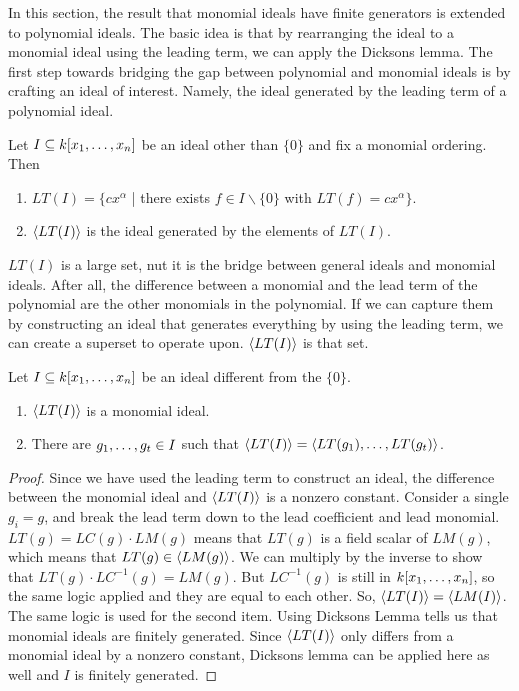 In this section, the result that monomial ideals have finite generators is extended to polynomial ideals. The basic idea is that by rearranging the ideal to a monomial ideal using the leading term, we can apply the Dicksons lemma. The first step towards bridging the gap between polynomial and monomial ideals is by crafting an ideal of interest. Namely, the ideal generated by the leading term of a polynomial ideal. 

\begin{definition}
    Let $I \subseteq k\lbrack x_1, \dots, x_n \rbrack$ be an ideal other than $\lbrace 0\rbrace$ and fix a monomial ordering. Then 
    \begin{enumerate}
        \item $LT(I) = \{cx^\alpha$ | there exists $f \in I \backslash \{0\}$ with $LT(f) = cx^\alpha\}$.
        \item $\langle LT(I) \rangle$ is the ideal generated by the elements of $LT(I)$.
    \end{enumerate}
\end{definition}

$LT(I)$ is a large set, nut it is the bridge between general ideals and monomial ideals. After all, the difference between a monomial and the lead term of the polynomial are the other monomials in the polynomial. If we can capture them by constructing an ideal that generates everything by using the leading term, we can create a superset to operate upon. $\langle LT(I) \rangle$ is that set.  

\begin{proposition}
Let $I \subseteq k\lbrack x_1, \dots, x_n \rbrack$ be an ideal different from the  $\lbrace 0\rbrace$.
\begin{enumerate}
    \item $\langle LT(I) \rangle$ is a monomial ideal.
    \item There are $g_1, \dots, g_t \in I$ such that
          $\langle LT(I) \rangle = \langle LT(g_1), \dots, LT(g_t) \rangle$.
\end{enumerate}
\end{proposition}

\begin{proof}
    Since we have used the leading term to construct an ideal, the difference between the monomial ideal and $\langle LT(I) \rangle$ is a nonzero constant. Consider a single $g_i = g$, and break the lead term down to the lead coefficient and lead monomial. $LT(g) = LC(g) \cdot LM(g)$ means that $LT(g)$ is a field scalar of $LM(g)$, which means that $LT(g)\in \langle LM(g) \rangle$. We can multiply by the inverse to show that $LT(g) \cdot LC^{-1}(g) = LM(g)$. But $LC^{-1}(g)$ is still in $k\lbrack x_1, \dots, x_n \rbrack$, so the same logic applied and they are equal to each other. So, $\langle LT(I) \rangle = \langle LM(I) \rangle$.
    The same logic is used for the second item. Using Dicksons Lemma tells us that monomial ideals are finitely generated. Since $\langle LT(I) \rangle$ only differs from a monomial ideal by a nonzero constant, Dicksons lemma can be applied here as well and $I$ is finitely generated.
\end{proof}

